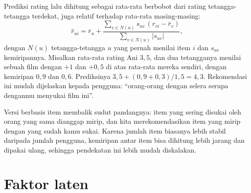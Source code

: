 Prediksi rating lalu dihitung sebagai rata-rata berbobot dari rating tetangga-tetangga terdekat, juga relatif
terhadap rata-rata masing-masing:
\begin{equation}
\hat r_{ui}=\bar r_u+\frac{\sum_{v\in N(u)}s_{uv}\,(r_{vi}-\bar r_v)}{\sum_{v\in N(u)}|s_{uv}|},
\end{equation}
dengan $N(u)$ tetangga-tetangga $u$ yang pernah menilai item $i$ dan $s_{uv}$ kemiripannya. Misalkan rata-rata rating
Ani $3{,}5$, dan dua tetangganya menilai sebuah film dengan $+1$ dan $+0{,}5$ di atas rata-rata mereka sendiri, dengan
kemiripan $0{,}9$ dan $0{,}6$. Prediksinya $3{,}5+(0{,}9+0{,}3)/1{,}5=4{,}3$. Rekomendasi ini mudah dijelaskan kepada
pengguna: ``orang-orang dengan selera serupa denganmu menyukai film ini''.

Versi berbasis item \citep{sarwar2001} membalik sudut pandangnya: item yang sering disukai oleh orang
yang sama dianggap mirip, dan kita merekomendasikan item yang mirip dengan yang sudah kamu sukai.
Karena jumlah item biasanya lebih stabil daripada jumlah pengguna, kemiripan antar item bisa dihitung
lebih jarang dan dipakai ulang, sehingga pendekatan ini lebih mudah diskalakan.

\section{Faktor laten}

